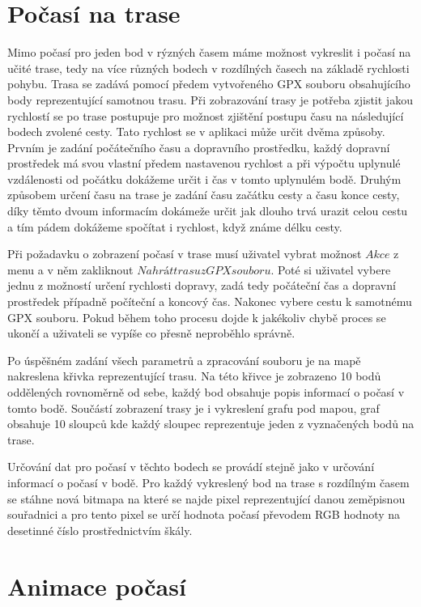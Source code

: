 \documentclass[czech,bachelor,dept460,male,csharp,cpdeclaration]{diploma}
\begin{document}
	\section{Počasí na trase}
	
	Mimo počasí pro jeden bod v rýzných časem máme možnost vykreslit i počasí na učité trase, tedy na více různých bodech v rozdílných časech na základě rychlosti pohybu. Trasa se zadává pomocí předem vytvořeného GPX souboru obsahujícího body reprezentující samotnou trasu. Při zobrazování trasy je potřeba zjistit jakou rychlostí se po trase postupuje pro možnost zjištění postupu času na následující bodech zvolené cesty. Tato rychlost se v aplikaci může určit dvěma způsoby. Prvním je zadání počátečního času a dopravního prostředku, každý dopravní prostředek má svou vlastní předem nastavenou rychlost a při výpočtu uplynulé vzdálenosti od počátku dokážeme určit i čas v tomto uplynulém bodě. Druhým způsobem určení času na trase je zadání času začátku cesty a času konce cesty, díky těmto dvoum informacím dokámeže určit jak dlouho trvá urazit celou cestu a tím pádem dokážeme spočítat i rychlost, když známe délku cesty.
	
	Při požadavku o zobrazení počasí v trase musí uživatel vybrat možnost $Akce$ z menu a v něm zakliknout $Nahrát trasu z GPX souboru$. Poté si uživatel vybere jednu z možností určení rychlosti dopravy, zadá tedy počáteční čas a dopravní prostředek případně počíteční a koncový čas. Nakonec vybere cestu k samotnému GPX souboru. Pokud během toho procesu dojde k jakékoliv chybě proces se ukončí a uživateli se vypíše co přesně neproběhlo správně.
	
	Po úspěšném zadání všech parametrů a zpracování souboru je na mapě nakreslena křivka reprezentující trasu. Na této křivce je zobrazeno 10 bodů oddělených rovnoměrně od sebe, každý bod obsahuje popis informací o počasí v tomto bodě. Součástí zobrazení trasy je i vykreslení grafu pod mapou, graf obsahuje 10 sloupců kde každý sloupec reprezentuje jeden z vyznačených bodů na trase. 
	
	Určování dat pro počasí v těchto bodech se provádí stejně jako v určování informací o počasí v bodě. Pro každý vykreslený bod na trase s rozdílným časem se stáhne nová bitmapa na které se najde pixel reprezentující danou zeměpisnou souřadnici a pro tento pixel se určí hodnota počasí převodem RGB hodnoty na desetinné číslo prostřednictvím škály.
	
	\section{Animace počasí}
	
\end{document}

